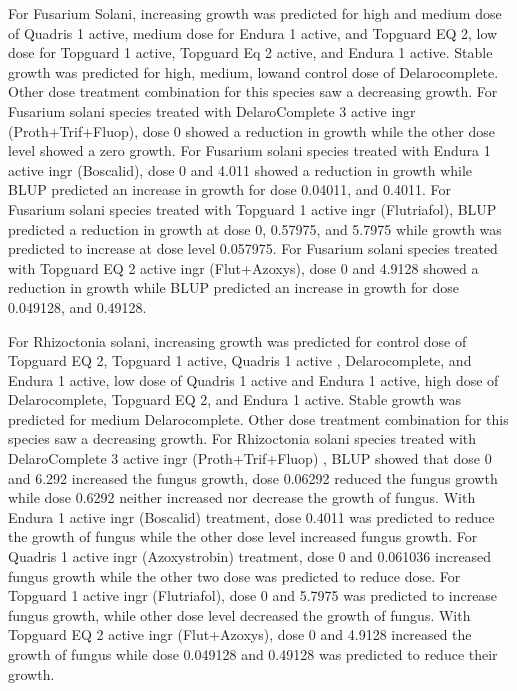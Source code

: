 \documentclass[
  10pt,
  letterpaper,
  twocolumn]{article}
\begin{document}
For Fusarium Solani, increasing growth was predicted for high and medium
dose of Quadris 1 active, medium dose for Endura 1 active, and Topguard
EQ 2, low dose for Topguard 1 active, Topguard Eq 2 active, and Endura 1
active. Stable growth was predicted for high, medium, lowand control
dose of Delarocomplete. Other dose treatment combination for this
species saw a decreasing growth. For Fusarium solani species treated
with DelaroComplete 3 active ingr (Proth+Trif+Fluop), dose 0 showed a
reduction in growth while the other dose level showed a zero growth. For
Fusarium solani species treated with Endura 1 active ingr (Boscalid),
dose 0 and 4.011 showed a reduction in growth while BLUP predicted an
increase in growth for dose 0.04011, and 0.4011. For Fusarium solani
species treated with Topguard 1 active ingr (Flutriafol), BLUP predicted
a reduction in growth at dose 0, 0.57975, and 5.7975 while growth was
predicted to increase at dose level 0.057975. For Fusarium solani
species treated with Topguard EQ 2 active ingr (Flut+Azoxys), dose 0 and
4.9128 showed a reduction in growth while BLUP predicted an increase in
growth for dose 0.049128, and 0.49128.

For Rhizoctonia solani, increasing growth was predicted for control dose
of Topguard EQ 2, Topguard 1 active, Quadris 1 active , Delarocomplete,
and Endura 1 active, low dose of Quadris 1 active and Endura 1 active,
high dose of Delarocomplete, Topguard EQ 2, and Endura 1 active. Stable
growth was predicted for medium Delarocomplete. Other dose treatment
combination for this species saw a decreasing growth. For Rhizoctonia
solani species treated with DelaroComplete 3 active ingr
(Proth+Trif+Fluop) , BLUP showed that dose 0 and 6.292 increased the
fungus growth, dose 0.06292 reduced the fungus growth while dose 0.6292
neither increased nor decrease the growth of fungus. With Endura 1
active ingr (Boscalid) treatment, dose 0.4011 was predicted to reduce
the growth of fungus while the other dose level increased fungus growth.
For Quadris 1 active ingr (Azoxystrobin) treatment, dose 0 and 0.061036
increased fungus growth while the other two dose was predicted to reduce
dose. For Topguard 1 active ingr (Flutriafol), dose 0 and 5.7975 was
predicted to increase fungus growth, while other dose level decreased
the growth of fungus. With Topguard EQ 2 active ingr (Flut+Azoxys), dose
0 and 4.9128 increased the growth of fungus while dose 0.049128 and
0.49128 was predicted to reduce their growth.
\end{document}
